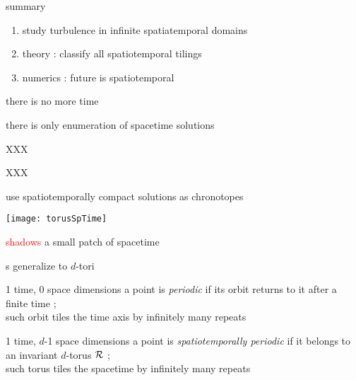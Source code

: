 \begin{frame}{summary}
\begin{enumerate}
              \item
study turbulence in infinite spatiatemporal domains
              \item
theory : classify all spatiotemporal tilings
              \item
numerics : future is spatiotemporal
\end{enumerate}

\vfill

there is no more time

\medskip

there is only enumeration of spacetime solutions
\end{frame}

\begin{frame}{XXX}
\end{frame}

\begin{frame}{XXX}
\end{frame}

\begin{frame}{use spatiotemporally compact solutions as chronotopes}
\begin{center}
\texttt{[image: torusSpTime]}
\end{center}
\textcolor{red}{shadows} a small patch of spacetime
\end{frame}

\begin{frame}{\po s generalize to $d$-tori}

\begin{block}{1 time, 0 space dimensions}
a {\statesp} point is {\em periodic} if its orbit returns to it
after a finite time \period{} ;
\\
such orbit tiles the time axis
by infinitely many repeats
\end{block}

\bigskip

\begin{block}{1 time, $d$-1 space dimensions}
 a {\statesp} point is {\em spatiotemporally periodic} if
it belongs to \\ an invariant $d$-torus ${\mathcal{R}}$ ;
\\
such torus tiles the spacetime
by infinitely many repeats
\end{block}
\end{frame}



